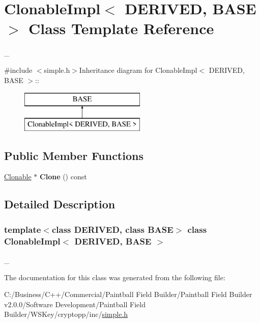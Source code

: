 \hypertarget{class_clonable_impl}{
\section{ClonableImpl$<$ DERIVED, BASE $>$ Class Template Reference}
\label{class_clonable_impl}
}


\_\-  


{\ttfamily \#include $<$simple.h$>$}Inheritance diagram for ClonableImpl$<$ DERIVED, BASE $>$::\begin{figure}[H]
\begin{center}
\leavevmode
\includegraphics[height=2cm]{class_clonable_impl}
\end{center}
\end{figure}
\subsection*{Public Member Functions}
\begin{DoxyCompactItemize}
\item 
\hypertarget{class_clonable_impl_a8aa4807d12b2c4653d2d6c69f3c51f53}{
\hyperlink{class_clonable}{Clonable} $\ast$ {\bfseries Clone} () const }
\label{class_clonable_impl_a8aa4807d12b2c4653d2d6c69f3c51f53}

\end{DoxyCompactItemize}


\subsection{Detailed Description}
\subsubsection*{template$<$class DERIVED, class BASE$>$ class ClonableImpl$<$ DERIVED, BASE $>$}

\_\- 

The documentation for this class was generated from the following file:\begin{DoxyCompactItemize}
\item 
C:/Business/C++/Commercial/Paintball Field Builder/Paintball Field Builder v2.0.0/Software Development/Paintball Field Builder/WSKey/cryptopp/inc/\hyperlink{simple_8h}{simple.h}\end{DoxyCompactItemize}
